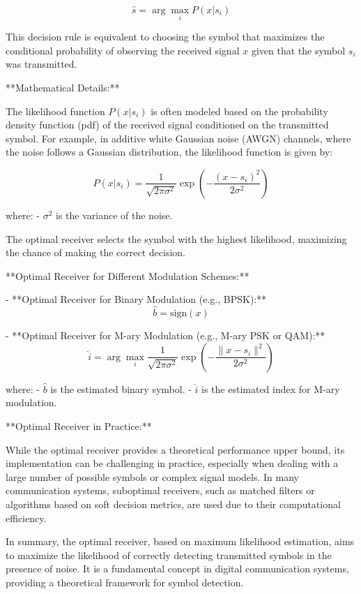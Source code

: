 \documentclass[../../../../DMCC-My-Notebook]{subfiles}
\begin{document}
	\[ \hat{s} = \arg\max_{i} P(x|s_i) \]
	
	This decision rule is equivalent to choosing the symbol that maximizes the conditional probability of observing the received signal \(x\) given that the symbol \(s_i\) was transmitted.
	
	**Mathematical Details:**
	
	The likelihood function \(P(x|s_i)\) is often modeled based on the probability density function (pdf) of the received signal conditioned on the transmitted symbol. For example, in additive white Gaussian noise (AWGN) channels, where the noise follows a Gaussian distribution, the likelihood function is given by:
	
	\[ P(x|s_i) = \frac{1}{\sqrt{2\pi \sigma^2}} \exp\left(-\frac{(x - s_i)^2}{2\sigma^2}\right) \]
	
	where:
	- \( \sigma^2 \) is the variance of the noise.
	
	The optimal receiver selects the symbol with the highest likelihood, maximizing the chance of making the correct decision.
	
	**Optimal Receiver for Different Modulation Schemes:**
	
	- **Optimal Receiver for Binary Modulation (e.g., BPSK):**
	\[ \hat{b} = \text{sign}(x) \]
	
	- **Optimal Receiver for M-ary Modulation (e.g., M-ary PSK or QAM):**
	\[ \hat{i} = \arg\max_{i} \frac{1}{\sqrt{2\pi \sigma^2}} \exp\left(-\frac{\|x - s_i\|^2}{2\sigma^2}\right) \]
	
	where:
	- \( \hat{b} \) is the estimated binary symbol.
	- \( \hat{i} \) is the estimated index for M-ary modulation.
	
	**Optimal Receiver in Practice:**
	
	While the optimal receiver provides a theoretical performance upper bound, its implementation can be challenging in practice, especially when dealing with a large number of possible symbols or complex signal models. In many communication systems, suboptimal receivers, such as matched filters or algorithms based on soft decision metrics, are used due to their computational efficiency.
	
	In summary, the optimal receiver, based on maximum likelihood estimation, aims to maximize the likelihood of correctly detecting transmitted symbols in the presence of noise. It is a fundamental concept in digital communication systems, providing a theoretical framework for symbol detection.
	
	
	
\end{document}
